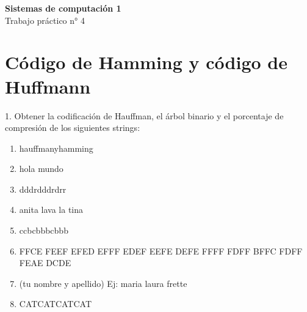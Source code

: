 \documentclass{article}
\begin{document}
	\begin{center}
		
		\LARGE \textbf{Sistemas de computación 1} \\[0.5cm]
		\LARGE Trabajo práctico n° 4 \\
	\end{center}	

	\section*{Código de Hamming y código de Huffmann}
	
	1. Obtener la codificación de Hauffman, el árbol binario y el porcentaje de compresión
	de los siguientes strings:
	\begin{enumerate}
	\item hauffmanyhamming
	\item hola mundo
	\item dddrdddrdrr
	\item anita lava la tina
	\item ccbcbbbcbbb
	\item FFCE FEEF EFED EFFF EDEF EEFE DEFE FFFF FDFF BFFC FDFF FEAE DCDE
	\item (tu nombre y apellido) Ej: maria laura frette
	\item CATCATCATCAT
	\end{enumerate}
\end{document}
